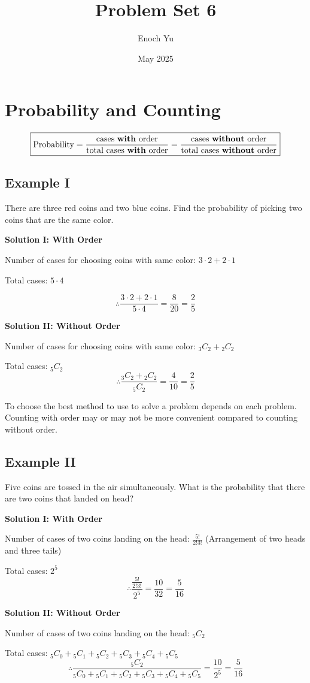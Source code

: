 \documentclass{article}
\title{Problem Set 6}
\author{Enoch Yu}
\date{May 2025}
\begin{document}
\section*{Probability and Counting}
\[
\boxed{\text{Probability}=
\frac{ \text{cases \textbf{with} order} }
{ \text{total cases \textbf{with} order} }
=\frac{ \text{cases \textbf{without} order} }
{ \text{total cases \textbf{without} order}} }
\]
\subsection*{Example I} There are three red coins
and two blue coins. Find the probability of picking
two coins that are the same color.

\textbf{Solution I: With Order}

Number of cases for choosing coins with same color:
$3 \cdot 2 + 2 \cdot 1$

Total cases: $5 \cdot 4$

\[
\therefore \frac{3 \cdot 2 + 2 \cdot 1}{5 \cdot 4}
= \frac{8}{20} = \boxed{\frac{2}{5}}
\]

\textbf{Solution II: Without Order}

Number of cases for choosing coins with same color:
${}_3C_2 + {}_2C_2$

Total cases: ${}_5C_2$
\[
\therefore \frac{{}_3C_2+{}_2C_2}{{}_5C_2}
= \frac{4}{10} = \boxed{\frac{2}{5}}
\]

To choose the best method to use to solve a problem
depends on each problem. Counting with order may or
may not be more convenient compared to counting without
order.

\subsection*{Example II} Five coins are tossed in the
air simultaneously. What is the probability that there
are two coins that landed on head?

\textbf{Solution I: With Order}

Number of cases of two coins landing on the head:
$\frac{5!}{2!3!}$ (Arrangement of two heads and
three tails)

Total cases: $2^5$
\[
\therefore \frac{ \frac{5!}{2!3!} }{2^5}
= \frac{10}{32} = \boxed{\frac{5}{16}}
\]

\textbf{Solution II: Without Order}

Number of cases of two coins landing on the head:
${}_5C_2$

Total cases:
${}_5C_0 + {}_5C_1 + {}_5C_2 + {}_5C_3 + {}_5C_4 + {}_5C_5$
\[
\therefore \frac{{}_5C_2}
{{}_5C_0 + {}_5C_1 + {}_5C_2 + {}_5C_3 + {}_5C_4 + {}_5C_5}
= \frac{10}{2^5} = \boxed{\frac{5}{16}}
\]
\end{document}
